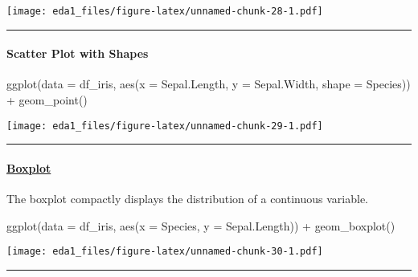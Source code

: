 \documentclass[
]{article}
\newenvironment{Shaded}{\begin{snugshade}}{\end{snugshade}}
\newcommand{\AttributeTok}[1]{\textcolor[rgb]{0.77,0.63,0.00}{#1}}
\newcommand{\FunctionTok}[1]{\textcolor[rgb]{0.00,0.00,0.00}{#1}}
\newcommand{\NormalTok}[1]{#1}
\newcommand{\SpecialCharTok}[1]{\textcolor[rgb]{0.00,0.00,0.00}{#1}}
\begin{document}
\texttt{[image: eda1\_files/figure-latex/unnamed-chunk-28-1.pdf]}

\begin{center}\rule{0.5\linewidth}{0.5pt}\end{center}

\hypertarget{scatter-plot-with-shapes}{%
\paragraph{Scatter Plot with Shapes}\label{scatter-plot-with-shapes}}

\begin{Shaded}
\begin{Highlighting}[]
\FunctionTok{ggplot}\NormalTok{(}\AttributeTok{data =}\NormalTok{ df\_iris, }\FunctionTok{aes}\NormalTok{(}\AttributeTok{x =}\NormalTok{ Sepal.Length, }\AttributeTok{y =}\NormalTok{ Sepal.Width, }\AttributeTok{shape =}\NormalTok{ Species)) }\SpecialCharTok{+}
  \FunctionTok{geom\_point}\NormalTok{()}
\end{Highlighting}
\end{Shaded}

\texttt{[image: eda1\_files/figure-latex/unnamed-chunk-29-1.pdf]}

\begin{center}\rule{0.5\linewidth}{0.5pt}\end{center}

\hypertarget{boxplot}{%
\paragraph{\texorpdfstring{\href{https://ggplot2.tidyverse.org/reference/geom_boxplot.html}{Boxplot}}{Boxplot}}\label{boxplot}}

The boxplot compactly displays the distribution of a continuous
variable.

\begin{Shaded}
\begin{Highlighting}[]
\FunctionTok{ggplot}\NormalTok{(}\AttributeTok{data =}\NormalTok{ df\_iris, }\FunctionTok{aes}\NormalTok{(}\AttributeTok{x =}\NormalTok{ Species, }\AttributeTok{y =}\NormalTok{ Sepal.Length)) }\SpecialCharTok{+}
  \FunctionTok{geom\_boxplot}\NormalTok{()}
\end{Highlighting}
\end{Shaded}

\texttt{[image: eda1\_files/figure-latex/unnamed-chunk-30-1.pdf]}

\begin{center}\rule{0.5\linewidth}{0.5pt}\end{center}
\end{document}
